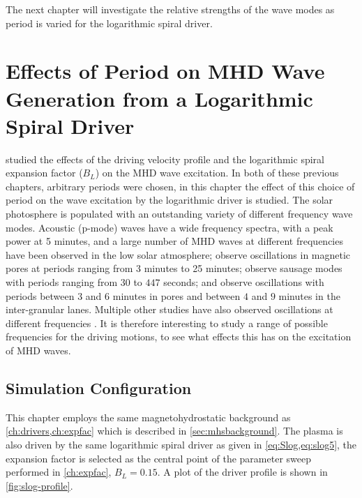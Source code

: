 \documentclass[a4paper,12pt,fourier,authoryear,custommargin]{Classes/PhDThesisPSnPDF}
\providecommand{\DIFaddtex}[1]{{\protect\color{blue}\uwave{#1}}} %
\providecommand{\DIFaddbegin}{} %
\providecommand{\DIFaddend}{} %
\providecommand{\DIFdelbegin}{} %
\providecommand{\DIFdelend}{} %
\providecommand{\DIFadd}[1]{\texorpdfstring{\DIFaddtex{#1}}{#1}} %
\begin{document}
The next chapter will investigate the relative strengths of the wave modes as period is varied for the logarithmic spiral driver.
\DIFdelbegin %

\DIFdelend \clearpage{}%
%

%
\clearpage{}%

\chapter{Effects of Period on MHD Wave Generation from a Logarithmic Spiral Driver}\label{ch:period}

 studied the effects of the driving velocity profile and the logarithmic spiral expansion factor ($B_L$) on the MHD wave excitation.
In both of these previous chapters, arbitrary periods were chosen, in this chapter the effect of this choice of period on the wave excitation by the logarithmic driver is studied.
The solar photosphere is populated with an outstanding variety of different frequency wave modes.
Acoustic (p-mode) waves have a wide frequency spectra, with a peak power at 5 minutes\DIFaddbegin \DIFadd{~}\DIFaddend \citep{leighton1962}, and a large number of MHD waves at different frequencies have been observed in the low solar atmosphere; \cite{Freij2014,Dorotovic2014} observe oscillations in magnetic pores at periods ranging from 3 minutes to 25 minutes; \cite{morton2011} observe sausage modes with periods ranging from $30$ to $447$ seconds; and \cite{fujimura2009} observe oscillations with periods between $3$ and $6$ minutes in pores and between $4$ and $9$ minutes in the inter-granular lanes.
Multiple other studies have also observed oscillations at different frequencies \DIFaddbegin \DIFadd{~}\DIFaddend \cite[e.g.][]{mathioudakis2013,reznikova2012,morton2012,mcintosh2011,zaqarashvili2009,jess2009,vecchio2007,kobanov2006,bogdan2006}.
It is therefore interesting to study a range of possible frequencies for the driving motions, to see what effects this has on the excitation of MHD waves.

\section{Simulation Configuration}\label{sec:periodconfig}
This chapter employs the same magnetohydrostatic background as \cref{ch:drivers,ch:expfac} which is described in \cref{sec:mhsbackground}.
The plasma is also driven by the same logarithmic spiral driver as given in \cref{eq:Slog,eq:slog5}, the expansion factor is selected as the central point of the parameter sweep performed in \cref{ch:expfac}, $B_L=0.15$.
A plot of the driver profile is shown in \cref{fig:slog-profile}.
\end{document}
